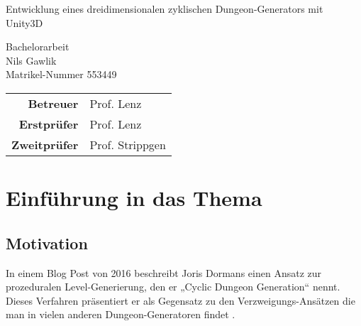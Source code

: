 
\pagestyle{empty} %

\clearscrheadings\clearscrplain
\begin{center}
\begin{Huge}
Entwicklung eines dreidimensionalen zyklischen Dungeon-Generators mit Unity3D\\
\end{Huge}
\vspace{8mm}
Bachelorarbeit\\
\vspace{0.4cm}
\vspace{2 cm}
Nils Gawlik \\
Matrikel-Nummer 553449\\
\vspace{8cm}
\begin{tabular}{rl}
{\bfseries Betreuer} & Prof. Lenz \\
{\bfseries Erstprüfer}& Prof. Lenz\\
{\bfseries Zweitprüfer}& Prof. Strippgen\\
\end{tabular}

\end{center}
\clearpage


\pagestyle{useheadings} %

\tableofcontents %
\listoffigures %

\chapter{Einführung in das Thema}

\section{Motivation}

In einem Blog Post von 2016 beschreibt Joris Dormans einen Ansatz zur prozeduralen Level-Generierung, den er „Cyclic Dungeon Generation“ nennt. Dieses Verfahren präsentiert er als Gegensatz zu den Verzweigungs-Ansätzen die man in vielen anderen Dungeon-Generatoren findet \cite{blogCyclic}.

